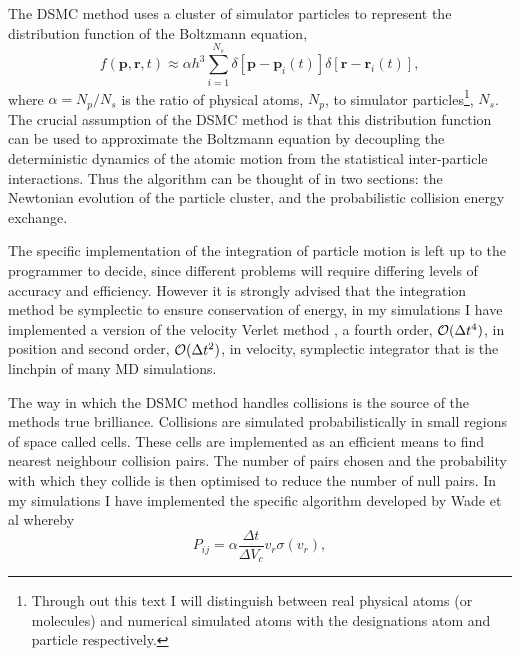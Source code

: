 The DSMC method uses a cluster of simulator particles to represent the distribution function of the Boltzmann equation,
\begin{equation*}
    f(\mathbf{p},\mathbf{r},t) \approx \alpha h^3 \sum_{i=1}^{N_s}\delta\left[\mathbf{p}-\mathbf{p}_i(t)\right]\delta\left[\mathbf{r}-\mathbf{r}_i(t)\right],
\end{equation*}
where $\alpha = N_p / N_s$ is the ratio of physical atoms, $N_p$, to simulator particles\footnote{Through out this text I will distinguish between real physical atoms (or molecules) and numerical simulated atoms with the designations atom and particle respectively.}, $N_s$.
The crucial assumption of the DSMC method is that this distribution function can be used to approximate the Boltzmann equation by decoupling the deterministic dynamics of the atomic motion from the statistical inter-particle interactions.
Thus the algorithm can be thought of in two sections: the Newtonian evolution of the particle cluster, and the probabilistic collision energy exchange.

The specific implementation of the integration of particle motion is left up to the programmer to decide, since different problems will require differing levels of accuracy and efficiency.
However it is strongly advised that the integration method be symplectic to ensure conservation of energy, in my simulations I have implemented a version of the velocity Verlet method \cite{verlet1967}, a fourth order, ${\cal O}(\Delta t^4)$, in position and second order, ${\cal O}(\Delta t^2)$, in velocity, symplectic integrator that is the linchpin of many MD simulations. 

The way in which the DSMC method handles collisions is the source of the methods true brilliance.
Collisions are simulated probabilistically in small regions of space called cells.
These cells are implemented as an efficient means to find nearest neighbour collision pairs.
The number of pairs chosen and the probability with which they collide is then optimised to reduce the number of null pairs.
In my simulations I have implemented the specific algorithm developed by Wade et al \cite{Wade2011} whereby
\begin{equation}
    P_{ij} = \alpha \frac{\Delta t}{\Delta V_c} v_r \sigma(v_r),
\end{equation}

